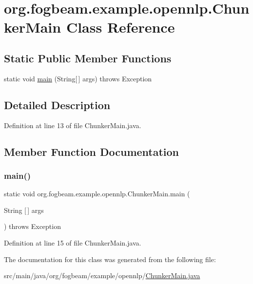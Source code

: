 \hypertarget{classorg_1_1fogbeam_1_1example_1_1opennlp_1_1_chunker_main}{}\section{org.\+fogbeam.\+example.\+opennlp.\+Chunker\+Main Class Reference}
\label{classorg_1_1fogbeam_1_1example_1_1opennlp_1_1_chunker_main}
\subsection*{Static Public Member Functions}
\begin{DoxyCompactItemize}
\item 
static void \hyperlink{classorg_1_1fogbeam_1_1example_1_1opennlp_1_1_chunker_main_aebe7fefe98c9216bf8fa956439def47b}{main} (String\mbox{[}$\,$\mbox{]} args)  throws Exception 	
\end{DoxyCompactItemize}


\subsection{Detailed Description}


Definition at line 13 of file Chunker\+Main.\+java.



\subsection{Member Function Documentation}
\hypertarget{classorg_1_1fogbeam_1_1example_1_1opennlp_1_1_chunker_main_aebe7fefe98c9216bf8fa956439def47b}{}\label{classorg_1_1fogbeam_1_1example_1_1opennlp_1_1_chunker_main_aebe7fefe98c9216bf8fa956439def47b} 
\subsubsection{\texorpdfstring{main()}{main()}}
{\footnotesize\ttfamily static void org.\+fogbeam.\+example.\+opennlp.\+Chunker\+Main.\+main (\begin{DoxyParamCaption}\item[{String \mbox{[}$\,$\mbox{]}}]{args }\end{DoxyParamCaption}) throws Exception\hspace{0.3cm}{\ttfamily [static]}}



Definition at line 15 of file Chunker\+Main.\+java.



The documentation for this class was generated from the following file\+:\begin{DoxyCompactItemize}
\item 
src/main/java/org/fogbeam/example/opennlp/\hyperlink{_chunker_main_8java}{Chunker\+Main.\+java}\end{DoxyCompactItemize}
